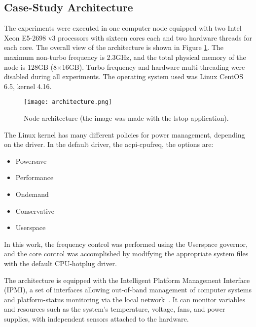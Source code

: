 \documentclass{ieeeaccess}
\begin{document}
\subsection{Case-Study Architecture} \label{sec:casestudyarchitecture}
The experiments were executed in one computer node equipped with two Intel Xeon E5-2698 v3 processors with sixteen cores each and two hardware threads for each core. The overall view of the architecture is shown in Figure \ref{fig:architecture}. The maximum non-turbo frequency is 2.3GHz, and the total physical memory of the node is 128GB (8$\times$16GB). Turbo frequency and hardware multi-threading were disabled during all experiments. The operating system used was Linux CentOS 6.5, kernel 4.16. 

\begin{figure}[htb!]
    \centering
    \texttt{[image: architecture.png]}
    \caption{Node architecture (the image was made with the lstop application).}
    \label{fig:architecture}
\end{figure}

The Linux kernel has many different policies for power management, depending on the driver. In the default driver, the acpi-cpufreq, the options are:
\begin{itemize}
    \item Powersave
    \item Performance
    \item Ondemand
    \item Conservative
    \item Userspace
\end{itemize}
In this work, the frequency control was performed using the Userspace governor, and the core control was accomplished by modifying the appropriate system files with the default CPU-hotplug driver.

The architecture is equipped with the Intelligent Platform Management Interface (IPMI), a set of interfaces allowing out-of-band management of computer systems and platform-status monitoring via the local network~\cite{Schwenkler2006IntelligentInterface}. It can monitor variables and resources such as the system's temperature, voltage, fans, and power supplies, with independent sensors attached to the hardware.
\end{document}
